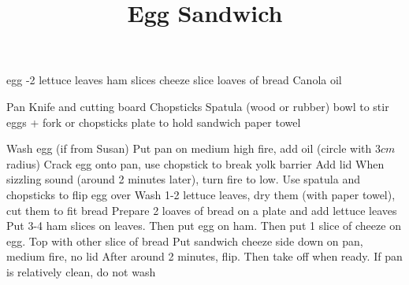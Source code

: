 \documentclass[10pt, twocolumn]{recipe}
\title{Egg Sandwich}
\begin{document}
\maketitle
\begin{ingredients}
   egg
  -2 lettuce leaves
   ham slices
   cheeze slice
   loaves of bread
  \Item Canola oil

\end{ingredients}

\begin{equipment}
  \Item Pan
  \Item Knife and cutting board
  \Item Chopsticks
  \Item Spatula (wood or rubber)
   bowl to stir eggs + fork or chopsticks
   plate to hold sandwich
  \Item \Optional paper towel
  \newpage
\end{equipment}

\begin{procedure}
\Step Wash egg (if from Susan)
\Step Put pan on medium high fire, add oil (circle with $3cm$ radius)
\Step Crack egg onto pan, use chopstick to break yolk barrier
\Step Add lid
\Step When sizzling sound (around 2 minutes later), turn fire to low. Use spatula and chopsticks to flip egg over
\Step Wash 1-2 lettuce leaves, dry them (with paper towel), cut them to fit bread
\Step Prepare 2 loaves of bread on a plate and add lettuce leaves
\Step Put 3-4 ham slices on leaves. Then put egg on ham. Then put 1 slice of cheeze on egg. Top with other slice of bread
\Step Put sandwich cheeze side down on pan, medium fire, no lid
\Step After around 2 minutes, flip. Then take off when ready.
\Note If pan is relatively clean, do not wash

\end{procedure}
\end{document}
